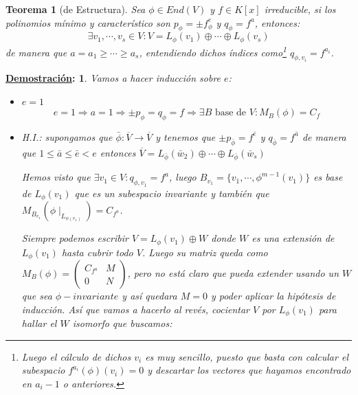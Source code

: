 \documentclass[10pt,a4paper,openright]{book}
\theoremstyle{break}
\newtheorem*{theo}{Teorema}
\newtheorem*{demo}{\underline{Demostración}:}
\begin{document}
\begin{theo}[de Estructura]
\label{Teorema de Estructura}
Sea $\phi\in End(V)$ y $f\in K[x]$ irreducible, si los polinomios mínimo y característico son $p_\phi =\pm f_\phi^e$ y $q_\phi=f^a$, entonces:
$$\exists v_1, \cdots, v_s\in V: V=L_\phi(v_1)\oplus\cdots \oplus L_\phi(v_s)$$
de manera que $a=a_1\geq \cdots \geq a_s$, entendiendo dichos índices como\footnote{Luego el cálculo de dichos $v_i$ es muy sencillo, puesto que basta con calcular el subespacio $f^{a_i}(\phi)(v_i) = 0$ y descartar los vectores que hayamos encontrado en $a_i - 1$ o anteriores.} $q_{\phi, v_i}=f^{a_i}$.
\end{theo}
\begin{demo}
Vamos a hacer inducción sobre $e$:
\begin{itemize}
\item $e=1$
$$e=1\Rightarrow a=1\Rightarrow \pm p_\phi=q_\phi=f\Rightarrow \exists B\mbox{ base de }V: M_B(\phi)=C_f$$

\item H.I.: supongamos que $\bar{\phi}: \overline{V}\rightarrow \overline{V}$ y tenemos que $\pm p_{\bar{\phi}}=f^{\bar{e}}$ y $q_{\overline{\phi}}=f^{\bar{a}}$ de manera que $1\leq \bar{a}\leq \bar{e}< e$ entonces $\overline{V}=L_{\bar{\phi}}(\bar{w}_2)\oplus \cdots \oplus L_{\bar{\phi}}(\bar{w}_s)$ 

Hemos visto que $\exists v_1\in V: q_{\phi,v_1}=f^a$, luego $B_{v_1}=\{v_1, \cdots, \phi^{m-1}(v_1)\}$ es base de $L_\phi(v_1)$ que es un subespacio invariante y también que $M_{B_{v_1}}(\phi\mid_{L_{\phi(v_1)}})=C_{f^a}$.

Siempre podemos escribir $V=L_\phi(v_1)\oplus W$ donde $W$ es una extensión de $L_\phi(v_1)$ hasta cubrir todo $V$. Luego su matriz queda como $M_B(\phi)=\begin{pmatrix}
C_{f^a} & M\\ 0 & N
\end{pmatrix}$, pero no está claro que pueda extender usando un $W$ que sea $\phi-invariante$ y así quedara $M=0$ y poder aplicar la hipótesis de inducción. Así que vamos a hacerlo al revés, cocientar  $V$ por $L_\phi(v_1)$ para hallar el $W$ isomorfo que buscamos:


\end{itemize}
\end{demo}
\end{document}
